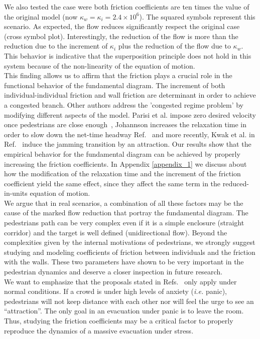 We also tested the case were both friction coefficients are ten times the value of the original model (now $\kappa_w = \kappa_i = 2.4\times10^{6}$). The squared symbols represent this scenario. As expected, the flow reduces significantly respect the original case (cross symbol plot). Interestingly, the reduction of the flow is more than the reduction due to the increment of $\kappa_i$ plus the reduction of the flow due to $\kappa_w$. This behavior is indicative that the superposition principle does not hold in this system because of the non-linearity of the equation of motion.   \\

This finding allows us to affirm that the friction plays a crucial role in the functional behavior of the fundamental diagram. The increment of both individual-individual friction and wall friction are determinant in order to achieve a congested branch. Other authors address the 'congested regime problem' by modifying different aspects of the model. Parisi et al. impose zero desired velocity once pedestrians are close enough~\cite{parisi2}, Johannson increases the relaxation time in order to slow down the net-time headway Ref.~\cite{johansson} and more recently, Kwak et al. in Ref.~\cite{kwak} induce the jamming transition by an attraction. Our results show that the empirical behavior for the fundamental diagram can be achieved by properly increasing the friction coefficients. In Appendix \ref{appendix_1} we discuss about how the modification of the relaxation time and the increment of the friction coefficient yield the same effect, since they affect the same term in the reduced-in-units equation of motion.  \\

We argue that in real scenarios, a combination of all these factors may be the cause of the marked flow reduction that portray the fundamental diagram. The pedestrians path can be very complex even if it is a simple enclosure (straight corridor) and the target is well defined (unidirectional flow). Beyond the complexities given by the internal motivations of pedestrians, we strongly suggest studying and modeling coefficients of friction between individuals and the friction with the walls. These two parameters have shown to be very important in the pedestrian dynamics and deserve a closer inspection in future research.\\

We want to emphasize that the proposals stated in Refs.~\cite{parisi2,johansson,kwak}  only apply under normal conditions. If a crowd is under high levels of anxiety (\textit{i.e.} panic), pedestrians will not keep distance with each other nor will feel the urge to see an ``attraction''. The only goal in an evacuation under panic is to leave the room. Thus, studying the friction coefficients may be a critical factor to properly reproduce the dynamics of a massive evacuation under stress.\\

